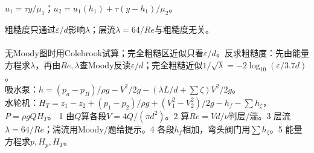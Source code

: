 $u_1=\tau y/\mu_1$；$u_2=u_1(h_1)+\tau(y-h_1)/\mu_2$。

粗糙度只通过$\varepsilon/d$影响$\lambda$；层流$\lambda=64/Re$与粗糙度无关。\\
\\
无Moody图时用Colebrook试算；完全粗糙区近似只看$\varepsilon/d$。反求粗糙度：先由能量方程求$\lambda$，再由$Re,\lambda$查Moody反读$\varepsilon/d$；完全粗糙近似$1/\sqrt{\lambda}=-2\log_{10}(\varepsilon/3.7d)$。\\
吸水泵：$h=(p_a-p_B)/\rho g-V^2/2g-(\lambda L/d+\sum\zeta)V^2/2g$。\\
水轮机：$H_T=z_1-z_2+(p_1-p_2)/\rho g+(V_1^2-V_2^2)/2g-h_f-\sum h_\zeta$，$P=\rho gQH_T$。
1 由$Q$算各段$V=4Q/(\pi d^2)$。2 算$Re=Vd/\nu$判层/湍。3 层流$\lambda=64/Re$；湍流用Moody/题给提示。4 各段$h_f$相加，弯头阀门用$\sum h_\zeta$。5 能量方程求$p,H_p,H_T$。

